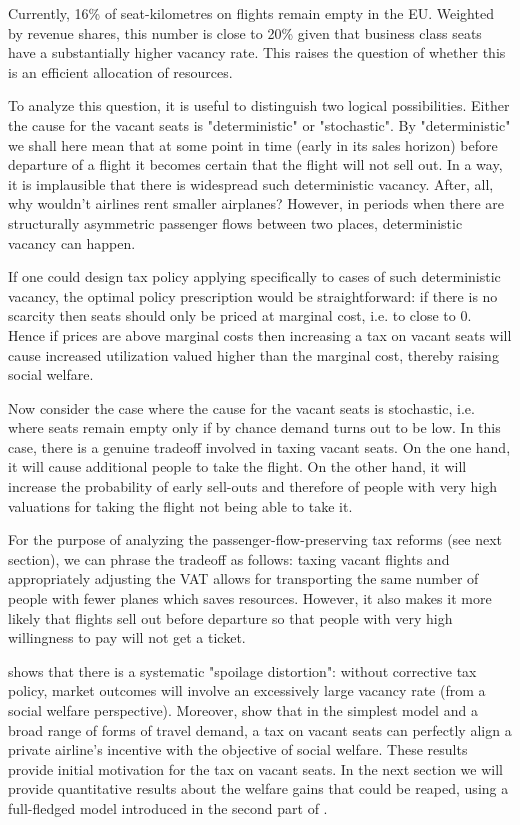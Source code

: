 \documentclass[../../main]{subfiles}
\begin{document}
Currently, 16\%  of seat-kilometres on flights remain empty in the EU. Weighted by revenue shares, this number is close to 20\%  given that business class seats have a substantially higher vacancy rate. This raises the question of whether this is an efficient allocation of resources.

To analyze this question, it is useful to distinguish two logical possibilities. Either the cause for the vacant seats is "deterministic" or "stochastic". By "deterministic" we shall here mean that at some point in time (early in its sales horizon) before departure of a flight it becomes certain that the flight will not sell out. In a way, it is implausible that there is widespread such deterministic vacancy. After, all, why wouldn't airlines rent smaller airplanes? However, in periods when there are structurally asymmetric passenger flows between two places, deterministic vacancy can happen.

If one could design tax policy applying specifically to cases of such deterministic vacancy, the optimal policy prescription would be straightforward: if there is no scarcity then seats should only be priced at marginal cost, i.e. to close to 0. Hence if prices are above marginal costs then increasing a tax on vacant seats will cause increased utilization valued higher than the marginal cost, thereby raising social welfare.

Now consider the case where the cause for the vacant seats is stochastic, i.e. where seats remain empty only if by chance demand turns out to be low. In this case, there is a genuine tradeoff involved in taxing vacant seats. On the one hand, it will cause additional people to take the flight. On the other hand, it will increase the probability of early sell-outs and therefore of people with very high valuations for taking the flight not being able to take it.

For the purpose of analyzing the passenger-flow-preserving tax reforms (see next section), we can phrase the tradeoff as follows: taxing vacant flights and appropriately adjusting the VAT allows for transporting the same number of people with fewer planes which saves resources. However, it also makes it more likely that flights sell out before departure so that people with very high willingness to pay will not get a ticket.

 \citet{Dörpinghaus_et_al_2026} shows that there is a systematic "spoilage distortion": without corrective tax policy, market outcomes will involve an excessively large vacancy rate (from a social welfare perspective). Moreover,  \citet{Dörpinghaus_et_al_2026} show that in the simplest model and a broad range of forms of travel demand, a tax on vacant seats can perfectly align a private airline's incentive with the objective of social welfare. These results provide initial motivation for the tax on vacant seats. In the next section we will provide quantitative results about the welfare gains that could be reaped, using a full-fledged model introduced in the second part of \citet{Dörpinghaus_et_al_2026} .
\end{document}
